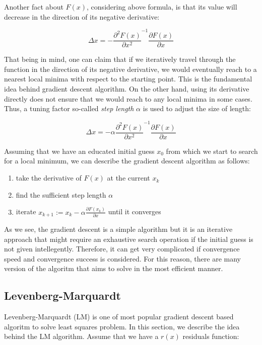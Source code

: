 \documentclass[a4paper]{report}
\numberwithin{figure}{section}
\begin{document}
Another fact about $F(x)$, considering above formula, is that its value will decrease 
in the direction of its negative derivative:

\begin{equation}
  \Delta x = - 
  \frac{\partial^2 F(x)}{\partial x^2}^{-1}
  \frac{\partial F(x)}{\partial x}
\end{equation}\label{eq:delta_x_descent_direction}

That being in mind, one can 
claim that if we iteratively travel through the function in the direction of its negative 
derivative, we would eventually reach to a nearest local minima with respect to the starting 
point. This is the fundamental idea behind gradient descent algorithm.
On the other hand, using its derivative directly does not ensure that 
we would reach to any local minima in some cases. Thus, a tuning factor so-called 
\textit{step length} $\alpha$ is used to adjust the size of length:

\begin{equation}
  \Delta x = -\alpha 
  \frac{\partial^2 F(x)}{\partial x^2}^{-1}
  \frac{\partial F(x)}{\partial x}
\end{equation}\label{eq:delta_x_step_length}


Assuming that we have an educated initial guess $x_0$ from which we start to search 
for a local minimum, we can describe the gradient descent algorithm as follows:

\begin{enumerate}
  \item take the derivative of $F(x)$ at the current $x_k$
  \item find the sufficient step length $\alpha$
  \item iterate $x_{k+1} := x_k - \alpha \frac{\partial F(x_k)}{\partial x}$ until it converges
\end{enumerate}

As we see, the gradient descent is a simple algorithm but it is an iterative 
approach that might require an exhaustive search operation if the initial 
guess is not given intellegently. Therefore, it can get very complicated 
if convergence speed and convergence success is considered. For this reason, 
there are many version of the algoritm that aims to solve in the most efficient 
manner.

\subsection{Levenberg-Marquardt}
Levenberg-Marquardt (LM) is one of most popular gradient descent based algoritm 
to solve least squares problem. In this section, we describe the idea behind 
the LM algorithm. Assume that we have a $r(x)$ residuals function:
\end{document}
